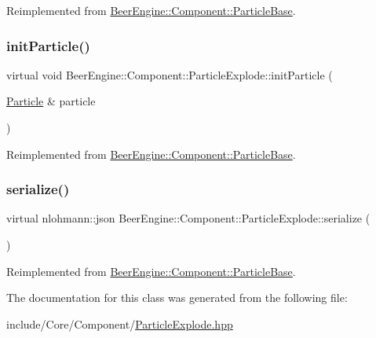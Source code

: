 Reimplemented from \mbox{\hyperlink{class_beer_engine_1_1_component_1_1_particle_base_a227b7fe0edab6df4b6c15f4b22bed7ae}{Beer\+Engine\+::\+Component\+::\+Particle\+Base}}.

\mbox{\label{class_beer_engine_1_1_component_1_1_particle_explode_abe727afab3c6a77d2b163e2c37a0f37b}} 
\subsubsection{\texorpdfstring{init\+Particle()}{initParticle()}}
{\footnotesize\ttfamily virtual void Beer\+Engine\+::\+Component\+::\+Particle\+Explode\+::init\+Particle (\begin{DoxyParamCaption}\item[{\mbox{\hyperlink{struct_beer_engine_1_1_component_1_1_particle}{Particle}} \&}]{particle }\end{DoxyParamCaption})\hspace{0.3cm}{\ttfamily [virtual]}}



Reimplemented from \mbox{\hyperlink{class_beer_engine_1_1_component_1_1_particle_base_a8d42fe68ec7c27aed419cde949ac278a}{Beer\+Engine\+::\+Component\+::\+Particle\+Base}}.

\mbox{\label{class_beer_engine_1_1_component_1_1_particle_explode_a194d098568efe69f8e8b62eec5863ae6}} 
\subsubsection{\texorpdfstring{serialize()}{serialize()}}
{\footnotesize\ttfamily virtual nlohmann\+::json Beer\+Engine\+::\+Component\+::\+Particle\+Explode\+::serialize (\begin{DoxyParamCaption}{ }\end{DoxyParamCaption})\hspace{0.3cm}{\ttfamily [virtual]}}



Reimplemented from \mbox{\hyperlink{class_beer_engine_1_1_component_1_1_particle_base_ac4ab484a5ef468cbb69cccdf39e6d9a8}{Beer\+Engine\+::\+Component\+::\+Particle\+Base}}.



The documentation for this class was generated from the following file\+:\begin{DoxyCompactItemize}
\item 
include/\+Core/\+Component/\mbox{\hyperlink{_particle_explode_8hpp}{Particle\+Explode.\+hpp}}\end{DoxyCompactItemize}

